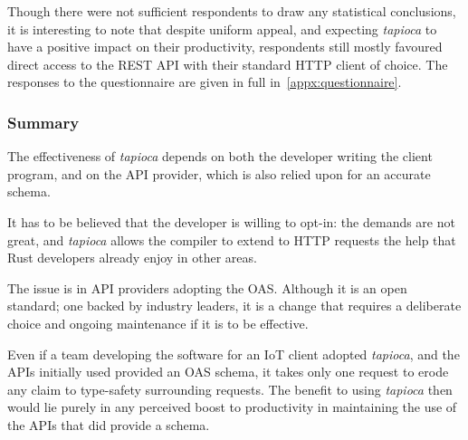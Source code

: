 Though there were not sufficient respondents to draw any statistical conclusions, it is interesting to note that despite uniform appeal, and expecting \emph{tapioca} to have a positive impact on their productivity, respondents still mostly favoured direct access to the REST API with their standard HTTP client of choice. The responses to the questionnaire are given in full in~\cref{appx:questionnaire}.

\subsubsection{Summary} \label{eval:tapioca:summary}

The effectiveness of \emph{tapioca} depends on both the developer writing the client program, and on the API provider, which is also relied upon for an accurate schema.

It has to be believed that the developer is willing to opt-in: the demands are not great, and \emph{tapioca} allows the compiler to extend to HTTP requests the help that Rust developers already enjoy in other areas.

The issue is in API providers adopting the OAS. Although it is an open standard; one backed by industry leaders, it is a change that requires a deliberate choice and ongoing maintenance if it is to be effective.

Even if a team developing the software for an IoT client adopted \emph{tapioca}, and the APIs initially used provided an OAS schema, it takes only one request to erode any claim to type-safety surrounding requests. The benefit to using \emph{tapioca} then would lie purely in any perceived boost to productivity in maintaining the use of the APIs that did provide a schema.